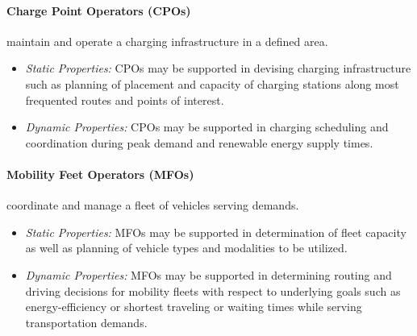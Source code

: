 \documentclass[a4paper,twoside]{article}
\begin{document}
\paragraph{Charge Point Operators (CPOs)} maintain and operate a charging infrastructure in a defined area.
\begin{itemize}
	\item \textit{Static Properties:} %
	 CPOs may be supported in devising charging infrastructure such as planning of placement and capacity of charging stations along most frequented routes and points of interest. 
	\item \textit{Dynamic Properties:} %
	 CPOs may be supported in charging scheduling and coordination during peak demand and renewable energy supply times.
\end{itemize}

\paragraph{Mobility Feet Operators (MFOs)} coordinate and manage a fleet of vehicles serving demands. 
\begin{itemize}
	\item \textit{Static Properties:} %
	MFOs may be supported in determination of fleet capacity as well as planning of vehicle types and modalities to be utilized.
	\item \textit{Dynamic Properties:} %
	MFOs may be supported in determining routing and driving decisions for mobility fleets with respect to underlying goals such as energy-efficiency or shortest traveling or waiting times while serving transportation demands.
\end{itemize}
	
	
		
\end{document}
